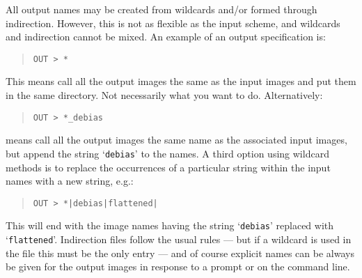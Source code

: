 \documentclass[twoside,11pt]{article}
\renewcommand{\_}{\texttt{\symbol{95}}}
\newenvironment{myquote}{\begin{quote}\begin{small}}{\end{small}\end{quote}}
\newcommand{\text}[1]{{\small \tt #1}}
\begin{document}
All output names may be created from wildcards and/or formed through
indirection. However, this is not as flexible as the input scheme,
and wildcards and indirection cannot be mixed. An example of an
output specification is:
\begin{myquote}
\begin{verbatim}
OUT > *
\end{verbatim}
\end{myquote}
This means call all the output images the same as the input images and put
them in the same directory.
Not necessarily what you want to do.
Alternatively:
\begin{myquote}
\begin{verbatim}
OUT > *_debias
\end{verbatim}
\end{myquote}
means call all the output images the same name as the associated
input images, but append the string `\text{\_debias}' to the names. A
third option using wildcard methods is to replace the occurrences of a
particular string within the input names with a new string, e.g.:
\begin{myquote}
\begin{verbatim}
OUT > *|debias|flattened|
\end{verbatim}
\end{myquote}
This will end with the image names having the string `\text{debias}'
replaced with `\text{flattened}'. Indirection files follow the usual
rules --- but if a wildcard is used in the file this must be the only
entry --- and of course explicit names can be always be given for the
output images in response to a prompt or on the command line.
\end{document}
